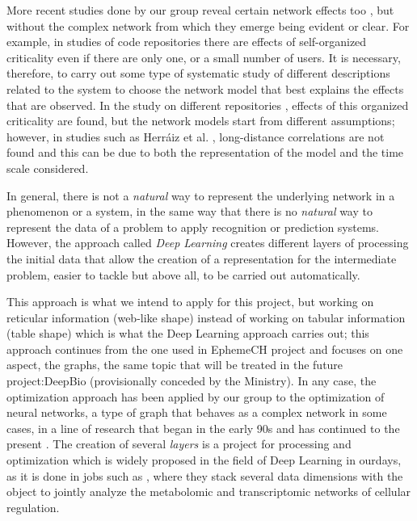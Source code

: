 \documentclass[runningheads,a4paper]{llncs}
\begin{document}
More recent studies done by our group reveal certain network effects
too \cite{wikipedia17}, but without the complex network from which they
emerge being evident or clear. For example, in studies of code
repositories \cite{soc17} there are effects of self-organized criticality
even if there are only one, or a small number of users. It is
necessary, therefore, to carry out some type of systematic study of
different descriptions related to the system to choose the network
model that best explains the effects that are observed. In the study
on different repositories \cite{repo17}, effects of this organized
criticality are found, but the network models start from different
assumptions; however, in studies such as Herráiz et al. \cite{Herraiz08},
long-distance correlations are not found and this can be due to both
the representation of the model and the time scale considered. 


In general, there is not a \textit{natural} way to represent the underlying
network in a phenomenon or a system, in the same way that there is no
\textit{natural} way to represent the data of a problem to apply recognition
or prediction systems. However, the approach called \textit{Deep Learning}
\cite{lecun2015deep} creates different layers of processing the initial
data that allow the creation of a representation for the intermediate
problem, easier to tackle but above all, to be carried out
automatically.

This approach is what we intend to apply for this project, but working
on reticular information (web-like shape) instead of working on tabular
information (table shape) which is what the Deep Learning approach
carries out; this approach continues from the one used in EphemeCH
project \cite{ECTA2015cotta} and focuses on one aspect, the graphs, the
same topic that will be treated in the future project:DeepBio
(provisionally conceded by the Ministry). In any case, the
optimization approach has been applied by our group to the
optimization of neural networks, a type of graph that behaves as a
complex network in some cases, in a line of research that began in the
early 90s \cite{glvq95} and has continued to the present \cite{castilloCEC99,parras2016radial}. The creation of several \textit{layers} is a project for
processing and optimization which is widely proposed in the field of
Deep Learning in ourdays, as it is done in jobs such as \cite{zhu2012},
where they stack several data dimensions with the object to jointly
analyze the metabolomic and transcriptomic networks of cellular
regulation. 
\end{document}
